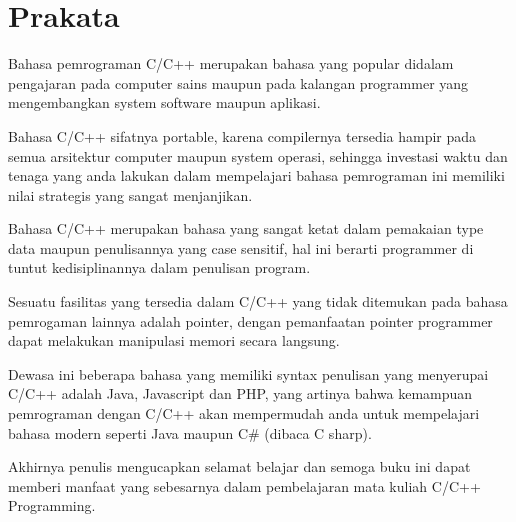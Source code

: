 \section*{Prakata}\label{prakata}

Bahasa pemrograman C/C++ merupakan bahasa yang popular didalam
pengajaran pada computer sains maupun pada kalangan programmer yang
mengembangkan system software maupun aplikasi.

Bahasa C/C++ sifatnya portable, karena compilernya tersedia hampir pada
semua arsitektur computer maupun system operasi, sehingga investasi
waktu dan tenaga yang anda lakukan dalam mempelajari bahasa pemrograman
ini memiliki nilai strategis yang sangat menjanjikan.

Bahasa C/C++ merupakan bahasa yang sangat ketat dalam pemakaian type
data maupun penulisannya yang case sensitif, hal ini berarti programmer
di tuntut kedisiplinannya dalam penulisan program.

Sesuatu fasilitas yang tersedia dalam C/C++ yang tidak ditemukan pada
bahasa pemrogaman lainnya adalah pointer, dengan pemanfaatan pointer
programmer dapat melakukan manipulasi memori secara langsung.

Dewasa ini beberapa bahasa yang memiliki syntax penulisan yang
menyerupai C/C++ adalah Java, Javascript dan PHP, yang artinya bahwa
kemampuan pemrograman dengan C/C++ akan mempermudah anda untuk
mempelajari bahasa modern seperti Java maupun C\# (dibaca C sharp).

Akhirnya penulis mengucapkan selamat belajar dan semoga buku ini dapat
memberi manfaat yang sebesarnya dalam pembelajaran mata kuliah C/C++
Programming.

